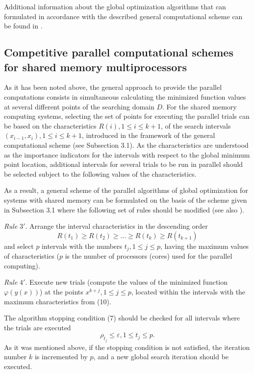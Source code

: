 \documentclass[
11pt,%
tightenlines,%
twoside,%
onecolumn,%
nofloats,%
nobibnotes,%
nofootinbib,%
superscriptaddress,%
noshowpacs,%
centertags]%
{revtex4}
\begin{document}
Additional information about the global optimization algorithms that can formulated in accordance with the described general computational scheme can be found in \cite{Strongin1, Strongin2}.


\subsection{Competitive parallel computational schemes for shared memory multiprocessors}

As it has been noted above, the general approach to provide the parallel computations consists in simultaneous calculating the minimized function values at several different points of the searching domain $D$. For the shared memory computing systems, selecting the set of points for executing the parallel trials can be based on the characteristics $R(i), 1 \leq i \leq k + 1$, of the search intervals $(x_{i-1} ,x_i), 1 \leq i \leq k + 1$, introduced in the framework of the general computational scheme (see Subsection 3.1). As the characteristics are understood as the importance indicators for the intervals with respect to the global minimum point location, additional intervals for several trials to be run in parallel should be selected subject to the following values of the characteristics.

As a result, a general scheme of the parallel algorithms of global optimization for systems with shared memory can be formulated on the basis of the scheme given in Subsection 3.1 where the following set of rules should be modified (see also \cite{Strongin1, Strongin2, Strongin4, Grishagin2}).

\textit{Rule} $3'$. Arrange the interval characteristics in the descending order
\begin{equation}
R(t_1) \geq R(t_2) \geq \dots \geq R(t_k) \geq R(t_{k+1})
\end{equation}
and select $p$ intervals with the numbers $t_j, 1 \leq j \leq p$, having the maximum values of characteristics ($p$ is the number of processors (cores) used for the parallel computing).

\textit{Rule} $4'$. Execute new trials (compute the values of the minimized function $\varphi(y(x))$) at the points $x^{k+j}, 1 \leq j \leq p$, located within the intervals with the maximum characteristics from (10).

The algorithm stopping condition (7) should be checked for all intervals where the trials are executed
\begin{equation}
\rho_{t_j} \leq \varepsilon, 1 \leq t_j \leq p.
\end{equation}
As it was mentioned above, if the stopping condition is not satisfied, the iteration number $k$ is incremented by $p$, and a new global search iteration should be executed.
\end{document}
